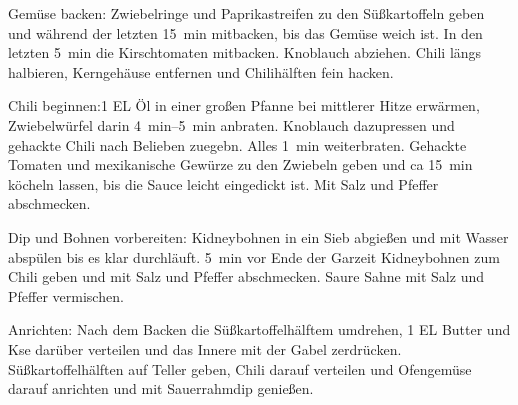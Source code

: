 Gemüse backen: Zwiebelringe und Paprikastreifen zu den Süßkartoffeln geben und während der letzten \SI{15}{min} mitbacken, bis das Gemüse weich ist.
In den letzten \SI{5}{min} die Kirschtomaten mitbacken.
Knoblauch abziehen.
Chili längs halbieren, Kerngehäuse entfernen und Chilihälften fein hacken.

Chili beginnen:\num{1} EL Öl in einer großen Pfanne bei mittlerer Hitze erwärmen, Zwiebelwürfel darin \SIrange{4}{5}{min} anbraten. 
Knoblauch dazupressen und gehackte Chili nach Belieben zuegebn.
Alles \SI{1}{min} weiterbraten.
Gehackte Tomaten und mexikanische Gewürze zu den Zwiebeln geben und ca \SI{15}{min} köcheln lassen, bis die Sauce leicht eingedickt ist. 
Mit Salz und Pfeffer abschmecken. 

Dip und Bohnen vorbereiten: Kidneybohnen in ein Sieb abgießen und mit Wasser abspülen bis es klar durchläuft.
\SI{5}{min} vor Ende der Garzeit Kidneybohnen zum Chili geben und mit Salz und Pfeffer abschmecken.
Saure Sahne mit Salz und Pfeffer vermischen.

Anrichten: Nach dem Backen die Süßkartoffelhälftem umdrehen, \num{1} EL Butter und Kse darüber verteilen und das Innere mit der Gabel zerdrücken. 
Süßkartoffelhälften auf Teller geben, Chili darauf verteilen und Ofengemüse darauf anrichten und mit Sauerrahmdip genießen. 